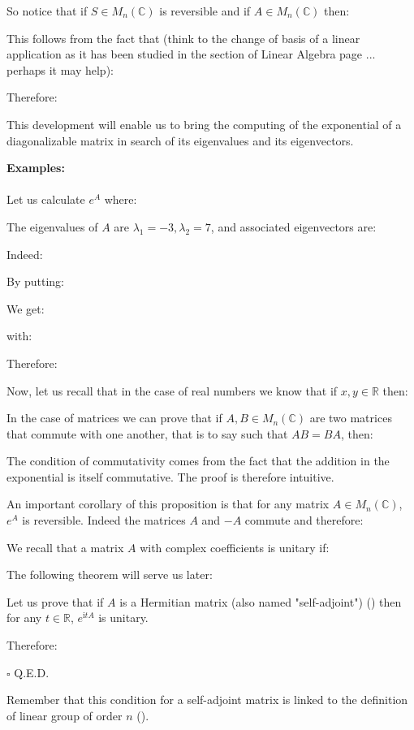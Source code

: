 	So notice that if $S\in M_n(\mathbb{C})$ is reversible and if $A\in M_n(\mathbb{C})$ then:
	
	This follows from the fact that (think to the change of basis of a linear application as it has been studied in the section of Linear Algebra page \pageref{change of basis}... perhaps it may help):
	
	Therefore:
	
	This development will enable us to bring the computing of the exponential of a diagonalizable matrix in search of its eigenvalues and its eigenvectors.
	\begin{tcolorbox}[colframe=black,colback=white,sharp corners]
	\textbf{{\Large {}}Examples:}\\\\
	Let us calculate $e^A$ where:
	
	The eigenvalues of $A$ are $\lambda_1=-3,\lambda_2=7$, and associated eigenvectors are:
	
	Indeed:
	
	By putting:
	
	We get:
	
	with:
	
	Therefore:
	
	\end{tcolorbox}
	Now, let us recall that in the case of real numbers we know that if $x,y\in \mathbb{R}$ then:
	
	In the case of matrices we can prove that if $A,B\in M_n(\mathbb{C})$ are two matrices that commute with one another, that is to say such that $AB=BA$, then:
	
	The condition of commutativity comes from the fact that the addition in the exponential is itself commutative. The proof is therefore intuitive.
	
	An important corollary of this proposition is that for any matrix $A\in M_n(\mathbb{C})$, $e^A$ is reversible. Indeed the matrices $A$ and $-A$ commute and therefore:
	
	We recall that a matrix $A$ with complex coefficients is unitary if:
	
	The following theorem will serve us later:
	\begin{theorem}
	Let us prove that if $A$ is a Hermitian matrix (also named "self-adjoint") () then for any $t\in\mathbb{R}$, $e^{\mathrm{i}tA}$ is unitary.
	\end{theorem}
	\begin{dem}
	
	Therefore:
	
	\begin{flushright}
		$\square$  Q.E.D.
	\end{flushright}
	\end{dem}
	Remember that this condition for a self-adjoint matrix is linked to the definition of linear group of order $n$ ().
	
